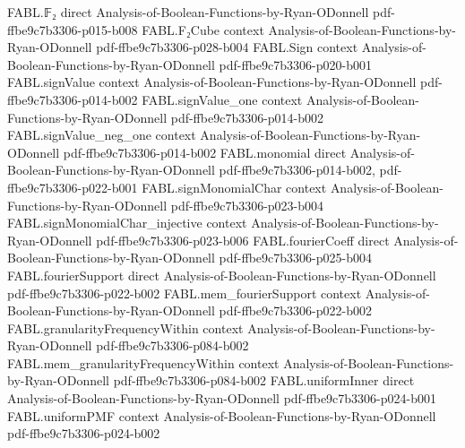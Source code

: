 \begin{theorem}
\label{FABL.blrFunctionTester_complete}
\leanok
{}
\proofstep
  {FABL.𝔽₂}
  {direct}
  {Analysis-of-Boolean-Functions-by-Ryan-ODonnell}
  {pdf-ffbe9c7b3306-p015-b008}
\proofstep
  {FABL.F₂Cube}
  {context}
  {Analysis-of-Boolean-Functions-by-Ryan-ODonnell}
  {pdf-ffbe9c7b3306-p028-b004}
\proofstep
  {FABL.Sign}
  {context}
  {Analysis-of-Boolean-Functions-by-Ryan-ODonnell}
  {pdf-ffbe9c7b3306-p020-b001}
\proofstep
  {FABL.signValue}
  {context}
  {Analysis-of-Boolean-Functions-by-Ryan-ODonnell}
  {pdf-ffbe9c7b3306-p014-b002}
\proofstep
  {FABL.signValue_one}
  {context}
  {Analysis-of-Boolean-Functions-by-Ryan-ODonnell}
  {pdf-ffbe9c7b3306-p014-b002}
\proofstep
  {FABL.signValue_neg_one}
  {context}
  {Analysis-of-Boolean-Functions-by-Ryan-ODonnell}
  {pdf-ffbe9c7b3306-p014-b002}
\proofstep
  {FABL.monomial}
  {direct}
  {Analysis-of-Boolean-Functions-by-Ryan-ODonnell}
  {pdf-ffbe9c7b3306-p014-b002,
    pdf-ffbe9c7b3306-p022-b001}
\proofstep
  {FABL.signMonomialChar}
  {context}
  {Analysis-of-Boolean-Functions-by-Ryan-ODonnell}
  {pdf-ffbe9c7b3306-p023-b004}
\proofstep
  {FABL.signMonomialChar_injective}
  {context}
  {Analysis-of-Boolean-Functions-by-Ryan-ODonnell}
  {pdf-ffbe9c7b3306-p023-b006}
\proofstep
  {FABL.fourierCoeff}
  {direct}
  {Analysis-of-Boolean-Functions-by-Ryan-ODonnell}
  {pdf-ffbe9c7b3306-p025-b004}
\proofstep
  {FABL.fourierSupport}
  {direct}
  {Analysis-of-Boolean-Functions-by-Ryan-ODonnell}
  {pdf-ffbe9c7b3306-p022-b002}
\proofstep
  {FABL.mem_fourierSupport}
  {context}
  {Analysis-of-Boolean-Functions-by-Ryan-ODonnell}
  {pdf-ffbe9c7b3306-p022-b002}
\proofstep
  {FABL.granularityFrequencyWithin}
  {context}
  {Analysis-of-Boolean-Functions-by-Ryan-ODonnell}
  {pdf-ffbe9c7b3306-p084-b002}
\proofstep
  {FABL.mem_granularityFrequencyWithin}
  {context}
  {Analysis-of-Boolean-Functions-by-Ryan-ODonnell}
  {pdf-ffbe9c7b3306-p084-b002}
\proofstep
  {FABL.uniformInner}
  {direct}
  {Analysis-of-Boolean-Functions-by-Ryan-ODonnell}
  {pdf-ffbe9c7b3306-p024-b001}
\proofstep
  {FABL.uniformPMF}
  {context}
  {Analysis-of-Boolean-Functions-by-Ryan-ODonnell}
  {pdf-ffbe9c7b3306-p024-b002}

\end{theorem}
